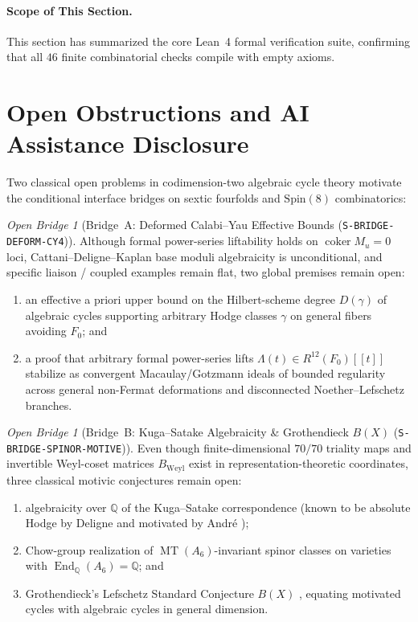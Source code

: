 \documentclass[11pt,a4paper]{amsart}
\theoremstyle{definition}
\theoremstyle{remark}
\newtheorem{openproblem}[theorem]{Open Bridge}
\DeclareMathOperator{\coker}{coker}
\DeclareMathOperator{\End}{End}
\DeclareMathOperator{\MT}{MT}
\begin{document}
\paragraph{Scope of This Section.}
This section has summarized the core Lean~4 formal verification suite, confirming that all $46$ finite combinatorial checks compile with empty axioms.

\section{Open Obstructions and AI Assistance Disclosure}
\label{sec:open}

Two classical open problems in codimension-two algebraic cycle theory motivate the conditional interface bridges on sextic fourfolds and $\mathrm{Spin}(8)$ combinatorics:

\begin{openproblem}[Bridge~A: Deformed Calabi--Yau Effective Bounds (\texttt{S-BRIDGE-DEFORM-CY4})]
\label{open:A}
Although formal power-series liftability holds on $\coker M_u = 0$ loci, Cattani--Deligne--Kaplan base moduli algebraicity \cite{CDK1995} is unconditional, and specific liaison / coupled examples remain flat, two global premises remain open:
\begin{enumerate}[label=(\alph*)]
\item an effective a priori upper bound on the Hilbert-scheme degree $D(\gamma)$ of algebraic cycles supporting arbitrary Hodge classes $\gamma$ on general fibers avoiding $F_0$; and
\item a proof that arbitrary formal power-series lifts $\Lambda(t) \in R^{12}(F_0)[[t]]$ stabilize as convergent Macaulay/Gotzmann ideals of bounded regularity across general non-Fermat deformations and disconnected Noether--Lefschetz branches.
\end{enumerate}
\end{openproblem}

\begin{openproblem}[Bridge~B: Kuga--Satake Algebraicity \& Grothendieck $B(X)$ (\texttt{S-BRIDGE-SPINOR-MOTIVE})]
\label{open:B}
Even though finite-dimensional $70/70$ triality maps and invertible Weyl-coset matrices $B_{\mathrm{Weyl}}$ exist in representation-theoretic coordinates, three classical motivic conjectures remain open:
\begin{enumerate}[label=(\alph*)]
\item algebraicity over $\mathbb{Q}$ of the Kuga--Satake correspondence (known to be absolute Hodge by Deligne \cite{Deligne1982} and motivated by Andr\'e \cite{Andre1996});
\item Chow-group realization of $\MT(A_6)$-invariant spinor classes on varieties with $\End_{\mathbb{Q}}(A_6) = \mathbb{Q}$; and
\item Grothendieck's Lefschetz Standard Conjecture $B(X)$ \cite{Grothendieck1969}, equating motivated cycles with algebraic cycles in general dimension.
\end{enumerate}
\end{openproblem}
\end{document}
